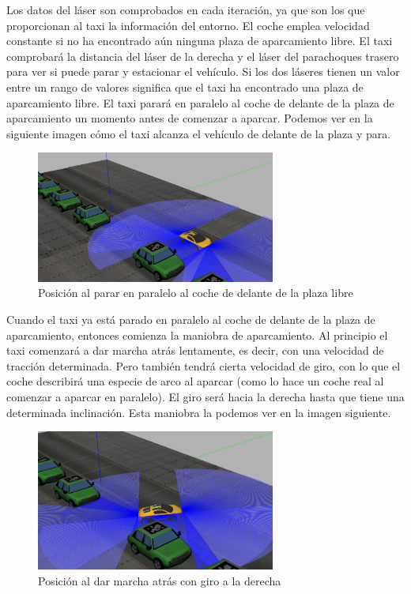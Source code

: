 Los datos del láser son comprobados en cada iteración, ya que son los que proporcionan al taxi la información del entorno. El coche emplea velocidad constante si no ha encontrado aún ninguna plaza de aparcamiento libre. El taxi comprobará la distancia del láser de la derecha y el láser del parachoques trasero para ver si puede parar y estacionar el vehículo. Si los dos láseres tienen un valor entre un rango de valores significa que el taxi ha encontrado una plaza de aparcamiento libre. El taxi parará en paralelo al coche de delante de la plaza de aparcamiento un momento antes de comenzar a aparcar. Podemos ver en la siguiente imagen cómo el taxi alcanza el vehículo de delante de la plaza y para.\\

\begin{figure}[H]
  \begin{center}
    \includegraphics[width=0.7\textwidth]{figures/Autopark/Posicion2.png}
		\caption{Posición al parar en paralelo al coche de delante de la plaza libre}
		\label{fig.Posicion2}
		\end{center}
\end{figure}

Cuando el taxi ya está parado en paralelo al coche de delante de la plaza de aparcamiento, entonces comienza la maniobra de aparcamiento. Al principio el taxi comenzará a dar marcha atrás lentamente, es decir, con una velocidad de tracción determinada. Pero también tendrá cierta velocidad de giro, con lo que el coche describirá una especie de arco al aparcar (como lo hace un coche real al comenzar a aparcar en paralelo). El giro será hacia la derecha hasta que tiene una determinada inclinación. Esta maniobra la podemos ver en la imagen siguiente.\\

\begin{figure}[H]
  \begin{center}
    \includegraphics[width=0.7\textwidth]{figures/Autopark/Posicion3.png}
		\caption{Posición al dar marcha atrás con giro a la derecha}
		\label{fig.Posicion3}
		\end{center}
\end{figure}

